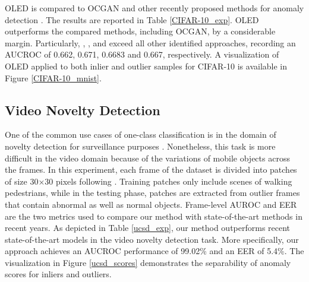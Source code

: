 \documentclass[10pt,twocolumn,letterpaper]{article}
\begin{document}
OLED is compared to OCGAN \cite{perera2019ocgan} and other recently proposed methods for anomaly detection \cite{abati2019latent, vincent2010stacked, schlegl2017unsupervised, ruff2018deep}. The results are reported in Table \ref{CIFAR-10_exp}. OLED outperforms the compared methods, including OCGAN, by a considerable margin. Particularly, , ,  and  exceed all other identified approaches, recording an AUCROC of 0.662, 0.671, 0.6683 and  0.667, respectively. A visualization of OLED applied to both inlier and outlier samples for CIFAR-10 is available in Figure \ref{CIFAR-10_mnist}. 

\subsection{Video Novelty Detection}
One of the common use cases of one-class classification is in the domain of novelty detection for surveillance purposes \cite{gong2019memorizing,zhou2017anomaly, sabokrou2018adversarially}. Nonetheless, this task is more difficult in the video domain because of the variations of mobile objects across the frames. In this experiment, each frame of the dataset is divided into patches of size 30×30 pixels following \cite{sabokrou2018adversarially}. Training patches only include scenes of walking pedestrians, while in the testing phase, patches are extracted from outlier frames that contain abnormal as well as normal objects. Frame-level  AUROC and EER are the two metrics used to compare our method with state-of-the-art methods in recent years. As depicted in Table \ref{ucsd_exp}, our method outperforms recent state-of-the-art models in the video novelty detection task. More specifically, our approach achieves an AUCROC performance of 99.02\% and an EER of 5.4\%. The visualization in Figure \ref{ucsd_scores} demonstrates the separability of anomaly scores for inliers and outliers. 
\end{document}
